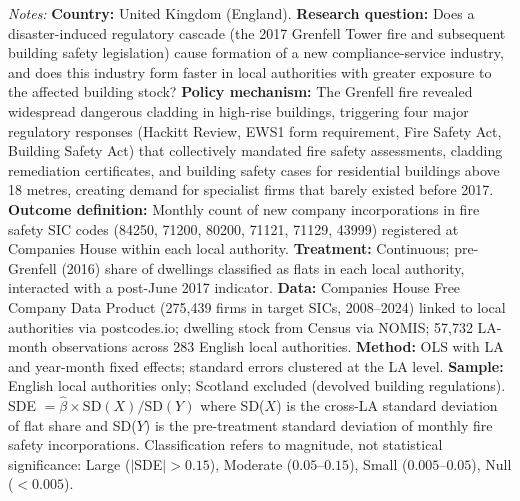 \begin{table}[htbp]
\begin{tablenotes}[flushleft]
\item \textit{Notes:} \textbf{Country:} United Kingdom (England). \textbf{Research question:} Does a disaster-induced regulatory cascade (the 2017 Grenfell Tower fire and subsequent building safety legislation) cause formation of a new compliance-service industry, and does this industry form faster in local authorities with greater exposure to the affected building stock? \textbf{Policy mechanism:} The Grenfell fire revealed widespread dangerous cladding in high-rise buildings, triggering four major regulatory responses (Hackitt Review, EWS1 form requirement, Fire Safety Act, Building Safety Act) that collectively mandated fire safety assessments, cladding remediation certificates, and building safety cases for residential buildings above 18 metres, creating demand for specialist firms that barely existed before 2017. \textbf{Outcome definition:} Monthly count of new company incorporations in fire safety SIC codes (84250, 71200, 80200, 71121, 71129, 43999) registered at Companies House within each local authority. \textbf{Treatment:} Continuous; pre-Grenfell (2016) share of dwellings classified as flats in each local authority, interacted with a post-June 2017 indicator. \textbf{Data:} Companies House Free Company Data Product (275,439 firms in target SICs, 2008--2024) linked to local authorities via postcodes.io; dwelling stock from Census via NOMIS; 57,732 LA-month observations across 283 English local authorities. \textbf{Method:} OLS with LA and year-month fixed effects; standard errors clustered at the LA level. \textbf{Sample:} English local authorities only; Scotland excluded (devolved building regulations). SDE $= \hat{\beta} \times \text{SD}(X) / \text{SD}(Y)$ where SD($X$) is the cross-LA standard deviation of flat share and SD($Y$) is the pre-treatment standard deviation of monthly fire safety incorporations. Classification refers to magnitude, not statistical significance: Large ($|$SDE$| > 0.15$), Moderate ($0.05$--$0.15$), Small ($0.005$--$0.05$), Null ($< 0.005$).
\end{tablenotes}
\end{table}
